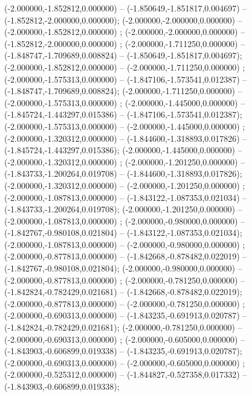  (-2.000000,-1.852812,0.000000) -- (-1.850649,-1.851817,0.004697) -- (-1.852812,-2.000000,0.000000);
 (-2.000000,-2.000000,0.000000) -- (-2.000000,-1.852812,0.000000) ;
 (-2.000000,-2.000000,0.000000) -- (-1.852812,-2.000000,0.000000) ;
 (-2.000000,-1.711250,0.000000) -- (-1.848747,-1.709689,0.008824) -- (-1.850649,-1.851817,0.004697);
 (-2.000000,-1.852812,0.000000) -- (-2.000000,-1.711250,0.000000) ;
 (-2.000000,-1.575313,0.000000) -- (-1.847106,-1.573541,0.012387) -- (-1.848747,-1.709689,0.008824);
 (-2.000000,-1.711250,0.000000) -- (-2.000000,-1.575313,0.000000) ;
 (-2.000000,-1.445000,0.000000) -- (-1.845724,-1.443297,0.015386) -- (-1.847106,-1.573541,0.012387);
 (-2.000000,-1.575313,0.000000) -- (-2.000000,-1.445000,0.000000) ;
 (-2.000000,-1.320312,0.000000) -- (-1.844600,-1.318893,0.017826) -- (-1.845724,-1.443297,0.015386);
 (-2.000000,-1.445000,0.000000) -- (-2.000000,-1.320312,0.000000) ;
 (-2.000000,-1.201250,0.000000) -- (-1.843733,-1.200264,0.019708) -- (-1.844600,-1.318893,0.017826);
 (-2.000000,-1.320312,0.000000) -- (-2.000000,-1.201250,0.000000) ;
 (-2.000000,-1.087813,0.000000) -- (-1.843122,-1.087353,0.021034) -- (-1.843733,-1.200264,0.019708);
 (-2.000000,-1.201250,0.000000) -- (-2.000000,-1.087813,0.000000) ;
 (-2.000000,-0.980000,0.000000) -- (-1.842767,-0.980108,0.021804) -- (-1.843122,-1.087353,0.021034);
 (-2.000000,-1.087813,0.000000) -- (-2.000000,-0.980000,0.000000) ;
 (-2.000000,-0.877813,0.000000) -- (-1.842668,-0.878482,0.022019) -- (-1.842767,-0.980108,0.021804);
 (-2.000000,-0.980000,0.000000) -- (-2.000000,-0.877813,0.000000) ;
 (-2.000000,-0.781250,0.000000) -- (-1.842824,-0.782429,0.021681) -- (-1.842668,-0.878482,0.022019);
 (-2.000000,-0.877813,0.000000) -- (-2.000000,-0.781250,0.000000) ;
 (-2.000000,-0.690313,0.000000) -- (-1.843235,-0.691913,0.020787) -- (-1.842824,-0.782429,0.021681);
 (-2.000000,-0.781250,0.000000) -- (-2.000000,-0.690313,0.000000) ;
 (-2.000000,-0.605000,0.000000) -- (-1.843903,-0.606899,0.019338) -- (-1.843235,-0.691913,0.020787);
 (-2.000000,-0.690313,0.000000) -- (-2.000000,-0.605000,0.000000) ;
 (-2.000000,-0.525312,0.000000) -- (-1.844827,-0.527358,0.017332) -- (-1.843903,-0.606899,0.019338);
